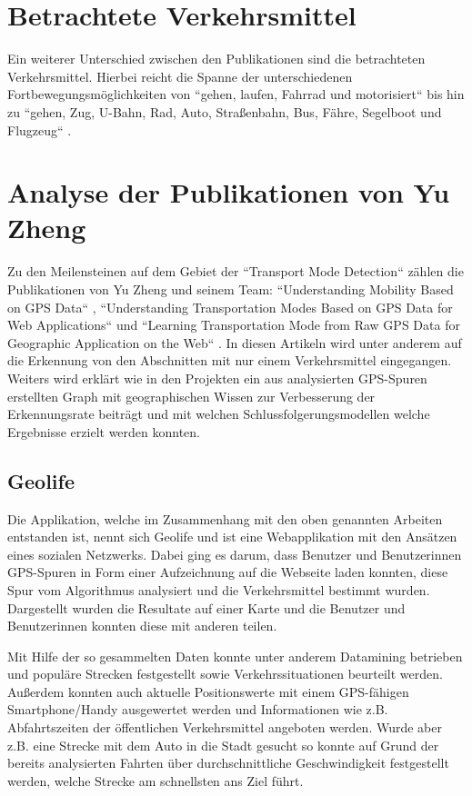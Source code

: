 \section{Betrachtete Verkehrsmittel}
Ein weiterer Unterschied zwischen den Publikationen sind die betrachteten Verkehrsmittel. Hierbei reicht die Spanne der unterschiedenen Fortbewegungsmöglichkeiten von ``gehen, laufen, Fahrrad und motorisiert`` \cite{reddy_using_2010} bis hin zu ``gehen, Zug, U-Bahn, Rad, Auto, Straßenbahn, Bus, Fähre, Segelboot und Flugzeug`` \cite{biljecki_transportation_2013}.

\section{Analyse der Publikationen von Yu Zheng}
Zu den Meilensteinen auf dem Gebiet der ``Transport Mode Detection`` zählen die Publikationen von Yu Zheng und seinem Team: ``Understanding Mobility Based on GPS Data`` \cite{zheng_understanding_2008}, ``Understanding Transportation Modes Based on GPS Data for Web Applications`` \cite{zheng_understanding_2010} und ``Learning Transportation Mode from Raw GPS Data for Geographic Application on the Web`` \cite{zheng_learning_2008}. In diesen Artikeln wird unter anderem auf die Erkennung von den Abschnitten mit nur einem Verkehrsmittel eingegangen. Weiters wird erklärt wie in den Projekten ein aus analysierten GPS-Spuren erstellten Graph mit geographischen Wissen zur Verbesserung der Erkennungsrate beiträgt und mit welchen Schlussfolgerungsmodellen welche Ergebnisse erzielt werden konnten. 

\subsection{Geolife}
Die Applikation, welche im Zusammenhang mit den oben genannten Arbeiten entstanden ist, nennt sich Geolife und ist eine Webapplikation mit den Ansätzen eines sozialen Netzwerks. Dabei ging es darum, dass Benutzer und Benutzerinnen GPS-Spuren in Form einer Aufzeichnung auf die Webseite laden konnten, diese Spur vom Algorithmus analysiert und die Verkehrsmittel bestimmt wurden. Dargestellt wurden die Resultate auf einer Karte und die Benutzer und Benutzerinnen konnten diese mit anderen teilen.

Mit Hilfe der so gesammelten Daten konnte unter anderem Datamining betrieben und populäre Strecken festgestellt sowie Verkehrssituationen beurteilt werden. Außerdem konnten auch aktuelle Positionswerte mit einem GPS-fähigen Smartphone/Handy ausgewertet werden und Informationen wie z.B. Abfahrtszeiten der öffentlichen Verkehrsmittel angeboten werden. Wurde aber z.B. eine Strecke mit dem Auto in die Stadt gesucht so konnte auf Grund der bereits analysierten Fahrten über durchschnittliche Geschwindigkeit festgestellt werden, welche Strecke am schnellsten ans Ziel führt.

